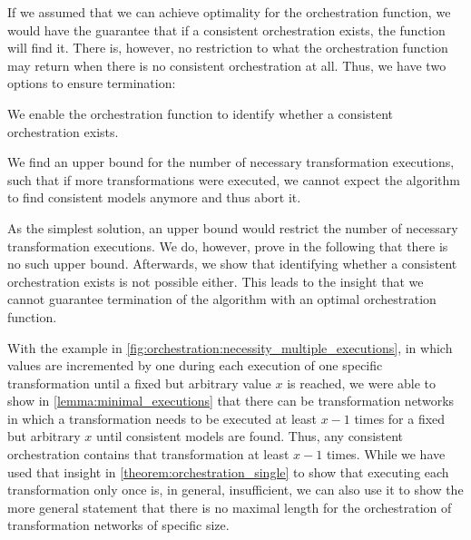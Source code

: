 If we assumed that we can achieve optimality for the orchestration function, we would have the guarantee that if a consistent orchestration exists, the function will find it.
There is, however, no restriction to what the orchestration function may return when there is no consistent orchestration at all.
Thus, we have two options to ensure termination:
\begin{longenumerate}
    \item We enable the orchestration function to identify whether a consistent orchestration exists.
    \item We find an upper bound for the number of necessary transformation executions, such that if more transformations were executed, we cannot expect the algorithm to find consistent models anymore and thus abort it.
\end{longenumerate}

As the simplest solution, an upper bound would restrict the number of necessary transformation executions.
We do, however, prove in the following that there is no such upper bound.
Afterwards, we show that identifying whether a consistent orchestration exists is not possible either.
This leads to the insight that we cannot guarantee termination of the algorithm with an optimal orchestration function.



With the example in \autoref{fig:orchestration:necessity_multiple_executions}, in which values are incremented by one during each execution of one specific transformation until a fixed but arbitrary value $x$ is reached, we were able to show in \autoref{lemma:minimal_executions} that there can be transformation networks in which a transformation needs to be executed at least $x-1$ times for a fixed but arbitrary $x$ until consistent models are found.
Thus, any consistent orchestration contains that transformation at least $x-1$ times.
While we have used that insight in \autoref{theorem:orchestration_single} to show that executing each transformation only once is, in general, insufficient, we can also use it to show the more general statement that there is no maximal length for the orchestration of transformation networks of specific size.

